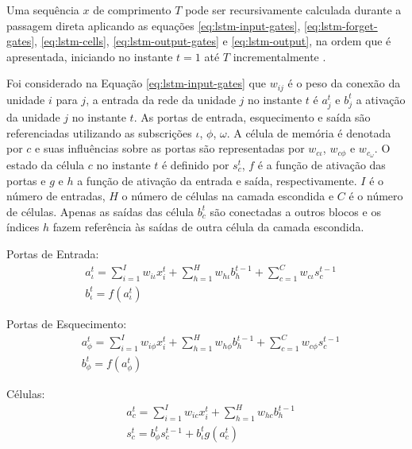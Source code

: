 Uma sequência $x$ de comprimento $T$ pode ser recursivamente calculada durante a passagem direta aplicando as equações \ref{eq:lstm-input-gates}, \ref{eq:lstm-forget-gates}, \ref{eq:lstm-cells}, \ref{eq:lstm-output-gates} e \ref{eq:lstm-output}, na ordem que é apresentada, iniciando no instante $t =1$ até $T$ incrementalmente \cite{Graves2012Supervised}.

Foi considerado na Equação \ref{eq:lstm-input-gates} que $w_{ij}$ é o peso da conexão da unidade $i$ para $j$, a entrada da rede da unidade $j$ no instante $t$ é $a_j^t$ e $b_j^t$ a ativação da unidade $j$ no instante $t$. As portas de entrada, esquecimento e saída são referenciadas utilizando as subscrições $\iota$, $\phi$, $\omega$. A célula de memória é denotada por $c$ e suas influências sobre as portas são representadas por $w_{c\iota}$, $w_{c\phi}$ e $w_{c_\omega}$. O estado da célula $c$ no instante $t$ é definido por $s_c^t$, $f$ é a função de ativação das portas e $g$ e $h$ a função de ativação da entrada e saída, respectivamente. $I$ é o número de entradas, $H$ o número de células na camada escondida e $C$ é o número de células. Apenas as saídas das célula $b_c^t$ são conectadas a outros blocos e os índices $h$ fazem referência às saídas de outra célula da camada escondida.

Portas de Entrada:
\begin{equation}
\begin{split}
    \label{eq:lstm-input-gates}
    & a_\iota^t = \sum_{i=1}^{I} w_{i\iota} x_i^t
                  + \sum_{h=1}^{H} w_{h\iota} b_h^{t-1}
                  + \sum_{c=1}^{C} w_{c\iota} s_c^{t-1} \\
    & b_\iota^t = f(a_\iota^t)
\end{split}
\end{equation}

Portas de Esquecimento:
\begin{equation}
\begin{split}
    \label{eq:lstm-forget-gates}
    & a_\phi^t = \sum_{i=1}^{I} w_{i\phi} x_i^t
                 + \sum_{h=1}^{H} w_{h\phi} b_h^{t-1}
                 + \sum_{c=1}^{C} w_{c\phi} s_c^{t-1} \\
    & b_\phi^t = f(a_\phi^t)
\end{split}
\end{equation}

Células:
\begin{equation}
\begin{split}
    \label{eq:lstm-cells}
    & a_c^t = \sum_{i=1}^{I} w_{ic} x_i^t
              + \sum_{h=1}^{H} w_{hc} b_h^{t-1} \\
    & s_c^t = b_\phi^t s_c^{t-1} + b_\iota^t g(a_c^t)
\end{split}
\end{equation}

